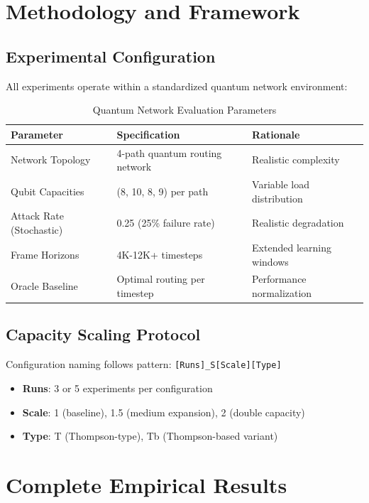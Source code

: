 \documentclass[12pt,a4paper]{article}
\begin{document}
\section{Methodology and Framework}

\subsection{Experimental Configuration}

All experiments operate within a standardized quantum network environment:

\begin{table}[H]
\centering
\caption{Quantum Network Evaluation Parameters}
\begin{tabular}{@{}lll@{}}
\toprule
\textbf{Parameter} & \textbf{Specification} & \textbf{Rationale} \\
\midrule
Network Topology & 4-path quantum routing network & Realistic complexity \\
Qubit Capacities & (8, 10, 8, 9) per path & Variable load distribution \\
Attack Rate (Stochastic) & 0.25 (25\% failure rate) & Realistic degradation \\
Frame Horizons & 4K-12K+ timesteps & Extended learning windows \\
Oracle Baseline & Optimal routing per timestep & Performance normalization \\
\bottomrule
\end{tabular}
\end{table}

\subsection{Capacity Scaling Protocol}

Configuration naming follows pattern: \texttt{[Runs]\_S[Scale][Type]}

\begin{itemize}
\item \textbf{Runs}: 3 or 5 experiments per configuration
\item \textbf{Scale}: 1 (baseline), 1.5 (medium expansion), 2 (double capacity)
\item \textbf{Type}: T (Thompson-type), Tb (Thompson-based variant)
\end{itemize}

\section{Complete Empirical Results}
\end{document}

